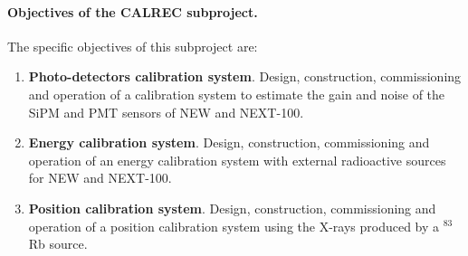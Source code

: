 \paragraph{Objectives of the CALREC subproject.}

The specific objectives of this subproject are:
\begin{enumerate}
\item {\bf Photo-detectors calibration system}. Design, construction, commissioning and operation of a calibration system to estimate the gain and noise of the SiPM and PMT sensors of NEW and NEXT-100. 

\item {\bf Energy calibration system}. Design, construction, commissioning and operation of an energy calibration system with external radioactive sources for NEW and NEXT-100.

\item {\bf Position calibration system}. Design, construction, commissioning and operation of a position calibration system using the X-rays produced by a $^{83}$Rb source. 


\end{enumerate}

